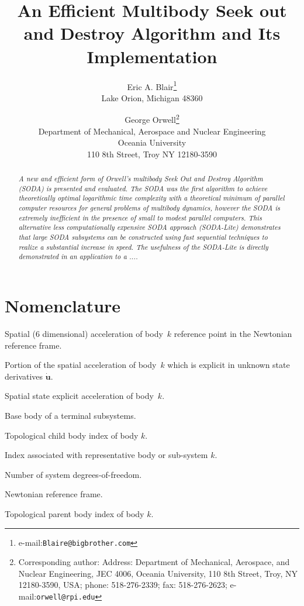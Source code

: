\documentclass[12pt]{article}
\newcommand{\sbf}{\mathbf}
\newenvironment{nomenclature}{
   \newcommand\entry[2]{
    \setbox\tempbox\hbox{\hspace{0.75in}}
      \hangindent\wd\tempbox\noindent{\makebox[0.75in][l]{##1}}\ignorespaces##2\par}
       }{\par\addvspace{12pt}}
\begin{document}
\title{An Efficient Multibody Seek out and Destroy Algorithm and Its Implementation}

\author{Eric A. Blair\thanks{e-mail:\texttt{Blaire@bigbrother.com}} \\
Lake Orion, Michigan 48360
 \and
George Orwell\thanks{Corresponding author: Address: Department of
Mechanical, Aerospace, and Nuclear Engineering, JEC 4006, Oceania
University, 110 8th Street, Troy, NY 12180-3590, USA; phone:
518-276-2339; fax: 518-276-2623;
e-mail:\texttt{orwell@rpi.edu}} \\
Department of Mechanical, Aerospace and Nuclear Engineering\\
Oceania University\\
110 8th Street, Troy NY 12180-3590}


\date{}
\maketitle

\linespread{2}
\selectfont

\begin{abstract}
{\it A new and efficient form of Orwell's multibody Seek Out and
Destroy Algorithm (SODA) is presented and evaluated.  The SODA was
the first algorithm to achieve theoretically optimal logarithmic
time complexity with a theoretical minimum of parallel computer
resources for general problems of multibody dynamics, however the
SODA is extremely inefficient in the presence of small to modest
parallel computers.  This alternative less computationally expensive
SODA approach (SODA-Lite) demonstrates that large SODA subsystems
can be constructed using fast sequential techniques to realize a
substantial increase in speed. The usefulness of the SODA-Lite is
directly demonstrated in an application to a .... }
\end{abstract}

\section*{Nomenclature}\label{S:Nomenclature}

\begin{nomenclature}
 \entry{$A^{k}$}{Spatial (6 dimensional) acceleration of body~$k$ reference point in the Newtonian reference frame.}
 \entry{$\hat{A}^{k}$}{Portion of the spatial acceleration of body~$k$ which is explicit in unknown state derivatives $\dot{\textbf{u}}$.}
 \entry{$\sbf A^{k}$}{Spatial state explicit acceleration of body~$k$.}
 \entry{$b$}{Base body of a terminal subsystems.}
 \entry{$ch[k]$}{Topological child body index of body $k$.}
 \entry{$k$}{Index associated with representative body or sub-system $k$.}
 \entry{$n$}{Number of system degrees-of-freedom.}
 \entry{$N$}{Newtonian reference frame.}
 \entry{$p[k]$}{Topological parent body index of body $k$.}

\end{nomenclature}
\end{document}

